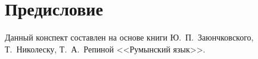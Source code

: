 \chapter*{Предисловие}

Данный конспект составлен на основе книги
Ю.~П.~Заюнчковского, Т.~Николеску, Т.~А.~Репиной <<Румынский язык>>.
